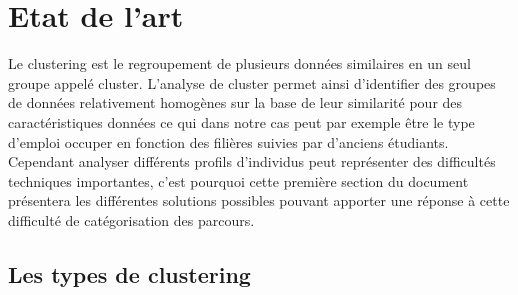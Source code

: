 \documentclass[memoire.tex]{subfiles}
\begin{document}
\chapter{Etat de l'art}
Le clustering est le regroupement de plusieurs données similaires en un seul groupe appelé cluster. L'analyse de cluster permet ainsi d'identifier des groupes de données relativement homogènes sur la base de leur similarité pour des caractéristiques données ce qui dans notre cas peut par exemple être le type d'emploi occuper en fonction des filières suivies par d'anciens étudiants. Cependant analyser différents profils d'individus peut représenter des difficultés techniques importantes, c'est pourquoi cette première section du document présentera les différentes solutions possibles pouvant apporter une réponse à cette difficulté de catégorisation des parcours.
	\section{Les types de clustering}
\end{document}
